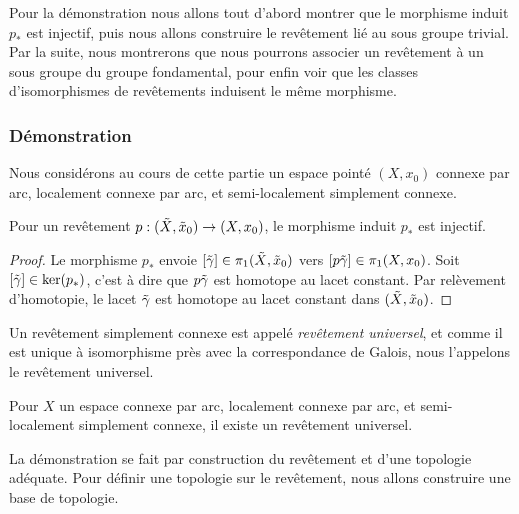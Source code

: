 Pour la démonstration nous allons tout d'abord montrer que le morphisme induit $p_\ast$ est injectif, puis nous allons construire le revêtement lié au sous groupe trivial. Par la suite, nous montrerons que nous pourrons associer un revêtement à un sous groupe du groupe fondamental, pour enfin voir que les classes d'isomorphismes de revêtements induisent le même morphisme.

\subsubsection{Démonstration}

Nous considérons au cours de cette partie un espace pointé $(X,x_0)$ connexe par arc, localement connexe par arc, et semi-localement simplement connexe.

\begin{proposition}
Pour un revêtement $p:(\Tilde{X},\Tilde{x}_0)\to(X,x_0)$, le morphisme induit $p_\ast$ est injectif.
\end{proposition}
\begin{proof}
Le morphisme $p_\ast$ envoie $[\Tilde{\gamma}]\in\pi_1(\Tilde{X},\Tilde{x}_0)$ vers $[p\Tilde{\gamma}]\in\pi_1(X,x_0)$. Soit $[\Tilde{\gamma}]\in\ker(p_\ast)$, c'est à dire que $p\Tilde{\gamma}$ est homotope au lacet constant. Par relèvement d'homotopie, le lacet $\Tilde{\gamma}$ est homotope au lacet constant dans $(\Tilde{X},\Tilde{x}_0)$.
\end{proof}

\begin{definition}
Un revêtement simplement connexe est appelé \emph{revêtement universel}, et comme il est unique à isomorphisme près avec la correspondance de Galois, nous l'appelons le revêtement universel.
\end{definition}

\begin{proposition}
Pour $X$ un espace connexe par arc, localement connexe par arc, et semi-localement simplement connexe, il existe un revêtement universel.
\end{proposition}
La démonstration se fait par construction du revêtement et d'une topologie adéquate. Pour définir une topologie sur le revêtement, nous allons construire une base de topologie.

